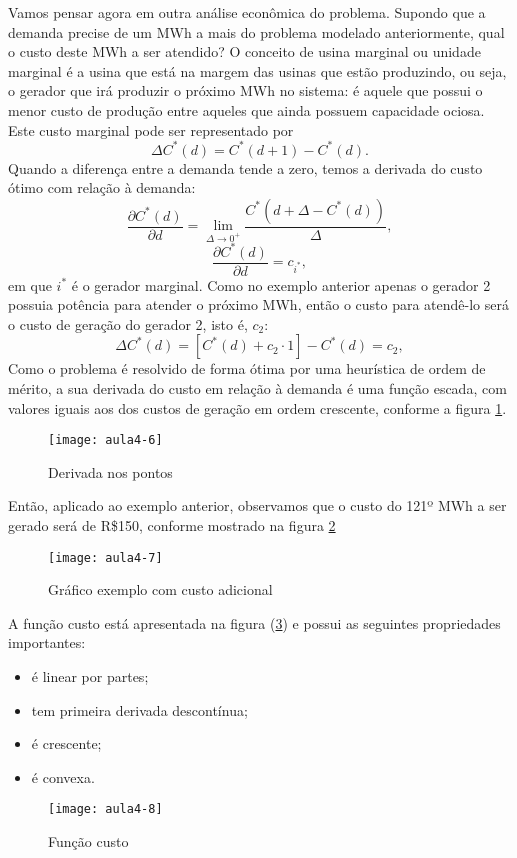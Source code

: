 Vamos pensar agora em outra análise econômica do problema. Supondo que a demanda precise de um MWh a mais do problema modelado anteriormente, qual o custo deste MWh a ser atendido?
O conceito de usina marginal ou unidade marginal é a usina que está na
margem das usinas que estão produzindo, ou seja, o gerador que irá produzir o próximo MWh no sistema: é aquele que possui o menor custo de produção entre aqueles que ainda possuem capacidade ociosa. 
Este custo marginal pode ser representado por
\[
	\Delta C^{*}(d)=C^{*}(d+1)-C^{*}(d).
\]
Quando a diferença entre a demanda tende a zero, temos a derivada do custo ótimo com relação à demanda:
\[
	\frac{\partial C^{*}(d)}{\partial d}=\lim_{\Delta\rightarrow0^{+}}\frac{C^{*}(d+\Delta-C^{*}(d))}{\Delta} ,
\]
\[
	\frac{\partial C^{*}(d)}{\partial d}=c_{i^{*}},
\]
em que $i^{*}$ é o gerador marginal.
Como no exemplo anterior apenas o gerador 2 possuia potência para atender o
próximo MWh, então o custo para atendê-lo será o custo de geração do gerador 2, isto é, $c_{2}$:
\[
\Delta C^{*}(d)=[C^{*}(d)+c_{2}\cdot1]-C^{*}(d)=c_{2},
\]
Como o problema é resolvido de forma ótima por uma heurística de ordem de mérito, a sua derivada do custo em relação à demanda é uma função escada, com valores iguais aos dos custos de geração em ordem crescente, conforme a figura \ref{fig:aula4-6}.
\begin{figure}[H]
\begin{centering}
\texttt{[image: aula4-6]}\protect\caption{\label{fig:aula4-6} Derivada nos pontos}
\end{centering}
\end{figure}
Então, aplicado ao exemplo anterior, observamos que o custo do 121º MWh a ser gerado será de R\$150, conforme mostrado na figura \ref{fig:aula4-7}
\begin{figure}[H]
\begin{centering}
\texttt{[image: aula4-7]}\protect\caption{\label{fig:aula4-7} Gráfico exemplo com custo adicional}
\end{centering}
\end{figure}
A função custo está apresentada na figura (\ref{fig:aula4-8}) e possui as seguintes propriedades importantes:
\begin{itemize}
\item é linear por partes;
\item tem primeira derivada descontínua;
\item é crescente;
\item é convexa.
\end{itemize}
\begin{figure}[H]
\begin{centering}
\texttt{[image: aula4-8]}\protect\caption{\label{fig:aula4-8} Função custo}
\end{centering}
\end{figure}



